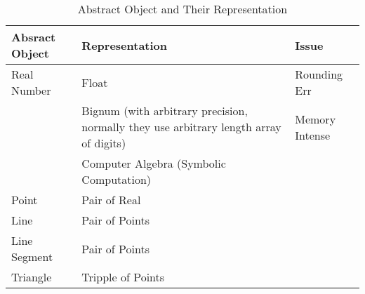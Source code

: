\documentclass[12pt]{article}
\begin{document}
\begin{table}[h!]
\centering
\caption{Abstract Object and Their Representation}
\label{tab:AO}
\begin{tabular}{@{}l p{5cm}l@{}}
\toprule
Absract Object & Representation                                                                        & Issue          \\ \midrule
Real Number    & Float                                                                                 & Rounding Err   \\
               & Bignum (with arbitrary precision, normally they use arbitrary length array of digits) & Memory Intense \\
               & Computer Algebra (Symbolic Computation)                                               &                \\
Point          & Pair of Real                                                                          &                \\
Line           & Pair of Points                                                                        &                \\
Line Segment   & Pair of Points                                                                        &                \\
Triangle       & Tripple of Points                                                                     &                \\ \bottomrule
\end{tabular}
\end{table}
\end{document}
